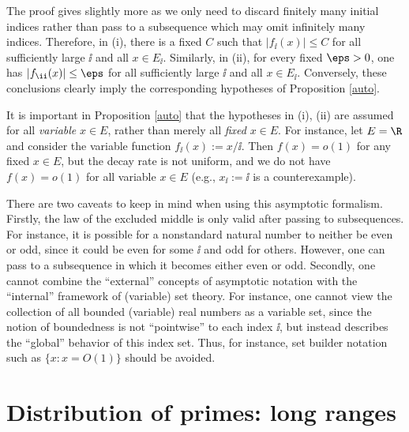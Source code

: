\begin{remark} The proof gives slightly more as we only need to discard finitely many initial indices rather than pass to a subsequence which may omit infinitely many indices. Therefore, in (i), there is a fixed $C$ such
that $|f_{\ii}(x)|\leq C$ for all sufficiently large $\ii$ and all
$x\in E_{\ii}$.  Similarly, in (ii), for every fixed $\eps>0$, one has
$|f_{\ii}(x)|\leq\eps$ for all sufficiently large $\ii$ and all
$x\in E_{\ii}$.  Conversely, these conclusions clearly imply the corresponding
hypotheses of Proposition \ref{auto}.
\end{remark}

\begin{remark} It is important in Proposition \ref{auto} that the hypotheses in (i), (ii) are assumed for all \emph{variable} $x \in E$, rather than merely all \emph{fixed} $x \in E$.  For instance, let $E = \R$ and consider the variable function $f_{\ii}(x) := x/\ii$.  Then $f(x) = o(1)$ for any fixed $x \in E$, but the decay rate is not uniform, and we do not have $f(x) = o(1)$ for all variable $x \in E$ (e.g., $x_\ii := \ii$ is a counterexample).
\end{remark}


\begin{remark} There are two caveats to keep in mind when using this asymptotic formalism.  Firstly, the law of the excluded middle is only valid after passing to subsequences.  For instance, it is possible for a nonstandard natural number to neither be even or odd, since it could be even for some $\ii$ and odd for others.  However, one can pass to a subsequence in which it becomes either even or odd.  Secondly, one cannot combine the ``external'' concepts of asymptotic notation with the ``internal'' framework of (variable) set theory.  For instance, one cannot view the collection of all bounded (variable) real numbers as a variable set, since the notion of boundedness is not ``pointwise'' to each index $\ii$, but instead describes the ``global'' behavior of this index set.  Thus, for instance, set builder notation such as $\{ x: x = O(1) \}$ should be avoided.
\end{remark}


\chapter{Distribution of primes: long ranges}
\label{chap:prime_counting_function}

